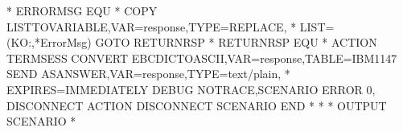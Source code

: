 \documentclass[letterpaper,10pt,english]{sphinxmanual}
\begin{document}
\begin{sphinxVerbatim}[commandchars=\\\{\}]
*
ERRORMSG EQU   *
         COPY\PYGZdl{} LIST\PYGZhy{}TO\PYGZhy{}VARIABLE,VAR=\PYGZsq{}response\PYGZsq{},TYPE=REPLACE,           *
               LIST=(\PYGZsq{}KO:\PYGZsq{},\PYGZsq{}*ErrorMsg\PYGZsq{})
         GOTO\PYGZdl{} RETURN\PYGZus{}RSP
*\PYGZus{}\PYGZus{}\PYGZus{}\PYGZus{}\PYGZus{}\PYGZus{}\PYGZus{}\PYGZus{}\PYGZus{}\PYGZus{}\PYGZus{}\PYGZus{}\PYGZus{}\PYGZus{}\PYGZus{}\PYGZus{}\PYGZus{}\PYGZus{}\PYGZus{}\PYGZus{}\PYGZus{}\PYGZus{}\PYGZus{}\PYGZus{}\PYGZus{}\PYGZus{}\PYGZus{}\PYGZus{}\PYGZus{}\PYGZus{}\PYGZus{}\PYGZus{}\PYGZus{}\PYGZus{}\PYGZus{}\PYGZus{}\PYGZus{}\PYGZus{}\PYGZus{}\PYGZus{}\PYGZus{}\PYGZus{}\PYGZus{}\PYGZus{}\PYGZus{}\PYGZus{}\PYGZus{}\PYGZus{}\PYGZus{}\PYGZus{}\PYGZus{}\PYGZus{}\PYGZus{}\PYGZus{}\PYGZus{}\PYGZus{}\PYGZus{}\PYGZus{}\PYGZus{}\PYGZus{}\PYGZus{}\PYGZus{}\PYGZus{}\PYGZus{}\PYGZus{}\PYGZus{}\PYGZus{}\PYGZus{}\PYGZus{}\PYGZus{}
RETURN\PYGZus{}RSP  EQU *
         ACTION\PYGZdl{} TERMSESS
         CONVERT\PYGZdl{} EBCDIC\PYGZhy{}TO\PYGZhy{}ASCII,VAR=\PYGZsq{}response\PYGZsq{},TABLE=\PYGZsq{}IBM1147\PYGZsq{}
         SEND\PYGZdl{} AS\PYGZhy{}ANSWER,VAR=\PYGZsq{}response\PYGZsq{},TYPE=\PYGZsq{}text/plain\PYGZsq{},             *
               EXPIRES=IMMEDIATELY
         DEBUG\PYGZdl{} NOTRACE,SCENARIO
         ERROR\PYGZdl{} 0,\PYGZsq{}\PYGZhy{}\PYGZhy{}\PYGZhy{} DISCONNECT\PYGZsq{}
         ACTION\PYGZdl{} DISCONNECT
         SCENARIO END
*
*\PYGZsh{}\PYGZsh{}\PYGZsh{}\PYGZsh{}\PYGZsh{}\PYGZsh{}\PYGZsh{}\PYGZsh{}\PYGZsh{}\PYGZsh{}\PYGZsh{}\PYGZsh{}\PYGZsh{}\PYGZsh{}\PYGZsh{}\PYGZsh{}\PYGZsh{}\PYGZsh{}\PYGZsh{}\PYGZsh{}\PYGZsh{}\PYGZsh{}\PYGZsh{}\PYGZsh{}\PYGZsh{}\PYGZsh{}\PYGZsh{}\PYGZsh{}\PYGZsh{}\PYGZsh{}\PYGZsh{}\PYGZsh{}\PYGZsh{}\PYGZsh{}\PYGZsh{}\PYGZsh{}\PYGZsh{}\PYGZsh{}\PYGZsh{}\PYGZsh{}\PYGZsh{}\PYGZsh{}\PYGZsh{}\PYGZsh{}\PYGZsh{}\PYGZsh{}\PYGZsh{}\PYGZsh{}\PYGZsh{}\PYGZsh{}\PYGZsh{}\PYGZsh{}\PYGZsh{}\PYGZsh{}\PYGZsh{}\PYGZsh{}\PYGZsh{}\PYGZsh{}\PYGZsh{}\PYGZsh{}\PYGZsh{}\PYGZsh{}\PYGZsh{}\PYGZsh{}\PYGZsh{}\PYGZsh{}\PYGZsh{}\PYGZsh{}\PYGZsh{}\PYGZsh{}
*\PYGZsh{}\PYGZsh{}                        OUTPUT SCENARIO                           \PYGZsh{}\PYGZsh{}
*\PYGZsh{}\PYGZsh{}\PYGZsh{}\PYGZsh{}\PYGZsh{}\PYGZsh{}\PYGZsh{}\PYGZsh{}\PYGZsh{}\PYGZsh{}\PYGZsh{}\PYGZsh{}\PYGZsh{}\PYGZsh{}\PYGZsh{}\PYGZsh{}\PYGZsh{}\PYGZsh{}\PYGZsh{}\PYGZsh{}\PYGZsh{}\PYGZsh{}\PYGZsh{}\PYGZsh{}\PYGZsh{}\PYGZsh{}\PYGZsh{}\PYGZsh{}\PYGZsh{}\PYGZsh{}\PYGZsh{}\PYGZsh{}\PYGZsh{}\PYGZsh{}\PYGZsh{}\PYGZsh{}\PYGZsh{}\PYGZsh{}\PYGZsh{}\PYGZsh{}\PYGZsh{}\PYGZsh{}\PYGZsh{}\PYGZsh{}\PYGZsh{}\PYGZsh{}\PYGZsh{}\PYGZsh{}\PYGZsh{}\PYGZsh{}\PYGZsh{}\PYGZsh{}\PYGZsh{}\PYGZsh{}\PYGZsh{}\PYGZsh{}\PYGZsh{}\PYGZsh{}\PYGZsh{}\PYGZsh{}\PYGZsh{}\PYGZsh{}\PYGZsh{}\PYGZsh{}\PYGZsh{}\PYGZsh{}\PYGZsh{}\PYGZsh{}\PYGZsh{}\PYGZsh{}

\end{sphinxVerbatim}
\end{document}
